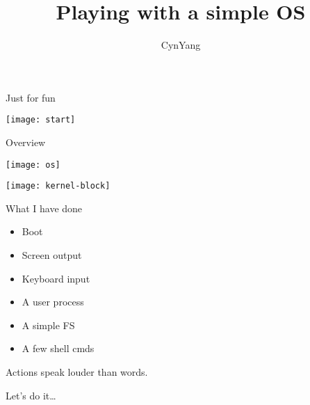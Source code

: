 \documentclass{swfubeamer}
\title{Playing with a simple OS}
\author{CynYang}
\begin{document}
\frame{\titlepage}

\begin{frame}{Just for fun}
  \begin{center}
    \texttt{[image: start]}
  \end{center}
\end{frame}

\begin{frame}{Overview}
  \begin{center}
    \begin{minipage}{.2\linewidth}
      \texttt{[image: os]}
    \end{minipage}\qquad\qquad
    \begin{minipage}{.45\linewidth}
      \texttt{[image: kernel-block]}
    \end{minipage}
  \end{center}
\end{frame}

\begin{frame}{What I have done}
  \begin{itemize}
  \item Boot
  \item Screen output
  \item Keyboard input
  \item A user process
  \item A simple FS
  \item A few shell cmds
  \end{itemize}
\end{frame}

\begin{frame}
  \begin{center}
    Actions speak louder than words.\par\bigskip
    
    Let's do it\ldots
  \end{center}
\end{frame}
\end{document}
